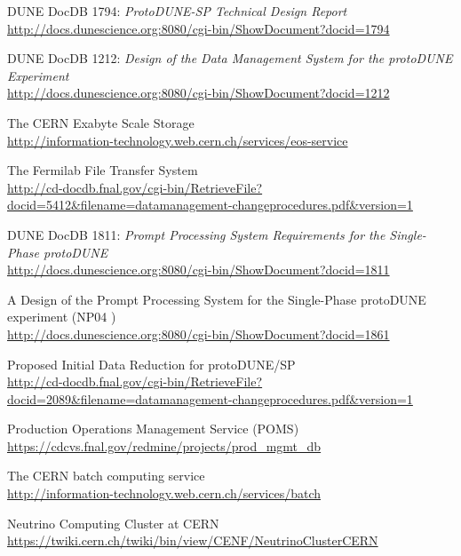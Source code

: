 \documentclass[pdftex,12pt,letter]{article}
\begin{document}
\clearpage
\begin{thebibliography}{1}

{DUNE DocDB 1794: \textit{ProtoDUNE-SP Technical Design Report }}\\
\url{http://docs.dunescience.org:8080/cgi-bin/ShowDocument?docid=1794}



{DUNE DocDB 1212: \textit{Design of the Data Management System for the protoDUNE Experiment}}\\
\url{http://docs.dunescience.org:8080/cgi-bin/ShowDocument?docid=1212}

{The CERN Exabyte Scale Storage}\\
\url{http://information-technology.web.cern.ch/services/eos-service}


{The Fermilab File Transfer System}\\
\url{http://cd-docdb.fnal.gov/cgi-bin/RetrieveFile?docid=5412&filename=datamanagement-changeprocedures.pdf&version=1}


{DUNE DocDB 1811: \textit{Prompt Processing System Requirements for the Single-Phase protoDUNE}}\\
\url{http://docs.dunescience.org:8080/cgi-bin/ShowDocument?docid=1811}

{A Design of the Prompt Processing System for the Single-Phase protoDUNE experiment (NP04 )}\\
\url{http://docs.dunescience.org:8080/cgi-bin/ShowDocument?docid=1861}

{Proposed Initial Data Reduction for protoDUNE/SP}\\
\url{http://cd-docdb.fnal.gov/cgi-bin/RetrieveFile?docid=2089&filename=datamanagement-changeprocedures.pdf&version=1}


{Production Operations Management Service (POMS)}\\
\url{https://cdcvs.fnal.gov/redmine/projects/prod_mgmt_db}


{The CERN batch computing service}\\
\url{http://information-technology.web.cern.ch/services/batch}



{Neutrino Computing Cluster at CERN}\\
\url{https://twiki.cern.ch/twiki/bin/view/CENF/NeutrinoClusterCERN}




\end{thebibliography}
\end{document}
